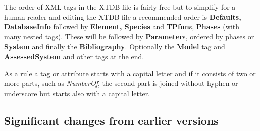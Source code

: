 \documentclass{article}
\begin{document}
The order of XML tags in the XTDB file is fairly free but to
simplify for a human reader and editing the XTDB file a recommended
order is {\bf Defaults, DatabaseInfo} followed by {\bf Element,
  Species} and {\bf TPfun}s, {\bf Phases} (with many nested tags).
These will be followed by {\bf Parameter}s, ordered by phases or {\bf
  System} and finally the {\bf Bibliography}.  Optionally the {\bf
  Model} tag and {\bf AssessedSystem} and other tags at the end.

As a rule a tag or attribute starts with a capital letter and if it
consists of two or more parts, such as {\em NumberOf}, the second part
is joined without hyphen or underscore but starts also with a capital
letter.

\subsection{Significant changes from earlier versions}\label{sec:changes}
\end{document}
